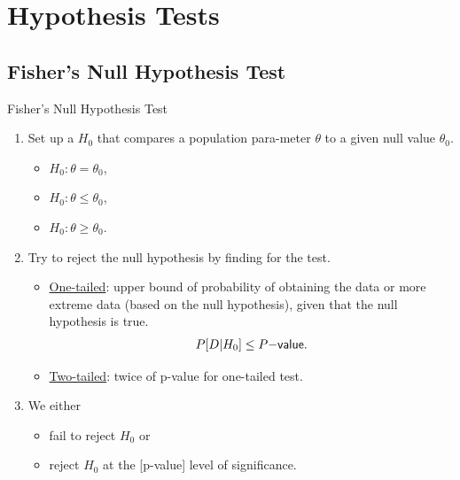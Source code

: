 \section{Hypothesis Tests}

\subsection{Fisher's Null Hypothesis Test}

\begin{frame}{Fisher's Null Hypothesis Test}

\begin{enumerate}
	\justifying
	\item Set up a  $H_0$ that compares a population para-meter $\theta$ to a given null value $\theta_0$.
	\begin{itemize}
		\item $H_0: \theta = \theta_0$,
		\item $H_0: \theta \leq \theta_0$,
		\item $H_0: \theta \geq \theta_0$.
	\end{itemize}
	\item Try to reject the null hypothesis by finding  for the test.\\
	\begin{itemize}
		\justifying
		\item \underline{One-tailed}: upper bound of probability of obtaining the data or more extreme data (based on the null hypothesis), given that the null hypothesis is true.
		\begin{align*}
		P[D|H_0]\leq P\mathsf{-value}.
		\end{align*}
		\item \underline{Two-tailed}: twice of p-value for one-tailed test.
	\end{itemize}
	\item We either 
	\begin{itemize}
		\item fail to reject $H_0$ or
		\item reject $H_0$ at the [p-value] level of significance.
	\end{itemize}
\end{enumerate}

\end{frame}

